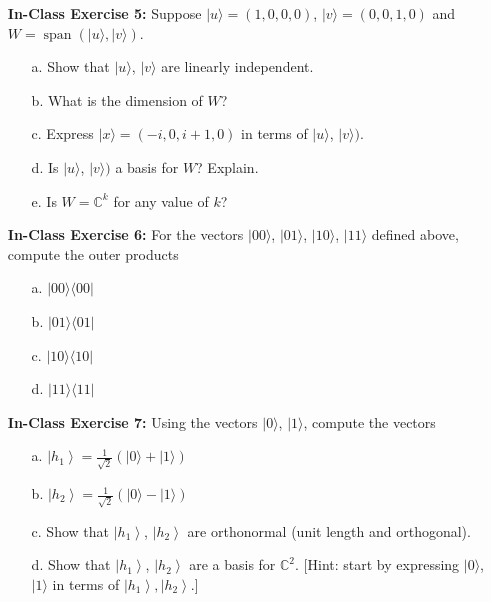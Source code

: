 \documentclass[main.tex]{subfiles}
\begin{document}
\begin{enumerate}
\begin{enumerate}
    \end{enumerate}

\item[] \textbf{In-Class Exercise 5:} Suppose $|u\rangle=(1,0,0,0)$, $|v\rangle=(0,0,1,0)$ and $W=\operatorname{span}(|u\rangle,|v\rangle)$.

    \begin{enumerate}
        \item[a.] Show that $|u\rangle$, $|v\rangle$ are linearly independent.
        \item[b.] What is the dimension of $W$?
        \item[c.] Express $|x\rangle=(-i, 0, i+1,0)$ in terms of $|u\rangle$, $|v\rangle)$.
        \item[d.] Is $|u\rangle$, $|v\rangle)$ a basis for $W$? Explain.
        \item[e.] Is $W=\mathbb{C}^{k}$ for any value of $k$?
    \end{enumerate}
    
\item[] \textbf{In-Class Exercise 6:} For the vectors $|00\rangle$, $|01\rangle$, $|10\rangle$, $|11\rangle$ defined above, compute the outer products

    \begin{enumerate}
        \item[a.] $|00\rangle\langle 00|$
        \item[b.] $|01\rangle\langle 01|$
        \item[c.] $|10\rangle\langle 10|$
        \item[d.] $|11\rangle\langle 11|$
    \end{enumerate}

\item[] \textbf{In-Class Exercise 7:} Using the vectors $|0\rangle$, $|1\rangle$, compute the vectors

    \begin{enumerate}
        \item[a.] $\left|h_{1}\right\rangle=\frac{1}{\sqrt{2}}(|0\rangle+|1\rangle)$
        \item[b.] $\left|h_{2}\right\rangle=\frac{1}{\sqrt{2}}(|0\rangle-|1\rangle)$
        \item[c.] Show that $\left|h_{1}\right\rangle$, $\left|h_{2}\right\rangle$ are orthonormal (unit length and orthogonal).
        \item[d.] Show that $\left|h_{1}\right\rangle$, $\left|h_{2}\right\rangle$ are a basis for $\mathbb{C}^2$. [Hint: start by expressing $|0\rangle$, $|1\rangle$ in terms of $\left|h_{1}\right\rangle,\left|h_{2}\right\rangle$.]   
        \end{enumerate}


\end{enumerate}
\end{document}
